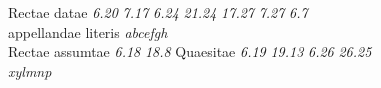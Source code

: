 \pend
\vspace{2em}%
%
%
\pstart%
\noindent%
\footnotesize%
Rectae datae \hspace*{9,75mm}\textit{6.20} \quad\textit{7.17} \quad\textit{6.24} \quad\textit{21.24} \quad\textit{17.27} \quad\textit{7.27} \quad\textit{6.7}\\
appellandae literis \quad\textit{a}\hspace*{8,2mm}\textit{b}\hspace*{8,3mm}\textit{c}\hspace*{8,26mm}\textit{e}\hspace*{10,37mm}\textit{f}\hspace*{9,9mm}\textit{g}\hspace*{8,2mm}\textit{h}\\
Rectae assumtae \hspace*{4,95mm}\textit{6.18} \quad\textit{18.8}
\quad Quaesitae \hspace*{3,5mm}\textit{6.19} \quad\textit{19.13} \quad\textit{6.26} \quad\textit{26.25}\\
\hspace*{27,85mm}\textit{x}\hspace*{8,2mm}\textit{y}\hspace*{25,5mm}\textit{l}\hspace*{9,0mm}\textit{m}\hspace*{8,6mm}\textit{n}\hspace*{8,2mm}\textit{p}%
\pend%
\vspace{2em}%
%
%
